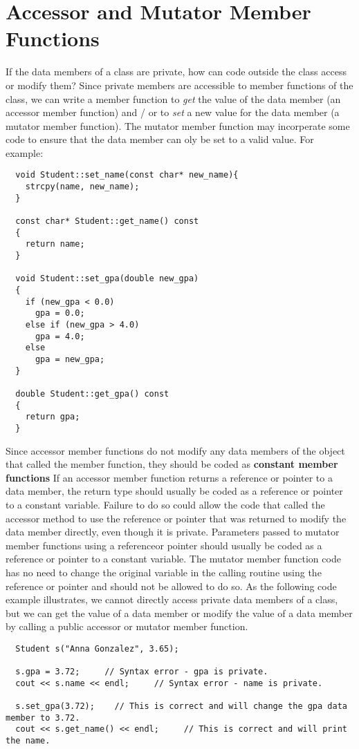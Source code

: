 \documentclass{report}
\begin{document}
  \section{Accessor and Mutator Member Functions}
  If the data members of a class are private, how can code outside the class access or modify them?
  \bigbreak \noindent
  Since private members are accessible to member functions of the class, we can write a member function to \textit{get} the value of the data member (an accessor member function) and / or to \textit{set} a new value for the data member (a mutator member function). The mutator member function may incorperate some code to ensure that the data member can oly be set to a valid value. For example:
  \begin{verbatim}
  void Student::set_name(const char* new_name){
    strcpy(name, new_name);
  }

  const char* Student::get_name() const
  {
    return name;
  }

  void Student::set_gpa(double new_gpa)
  {
    if (new_gpa < 0.0)
      gpa = 0.0;
    else if (new_gpa > 4.0)
      gpa = 4.0;
    else
      gpa = new_gpa;
  }

  double Student::get_gpa() const
  {
    return gpa;
  }
  \end{verbatim}
  \bigbreak \noindent
  Since accessor member functions do not modify any data members of the object that called the member function, they should be coded as \textbf{constant member functions}
  \bigbreak \noindent
  If an accessor member function returns a reference or pointer to a data member, the return type should usually be coded as a reference or pointer to a constant variable. Failure to do so could allow  the code that called the accessor method to use the reference or pointer that was returned to modify the data member directly, even though it is private.
  \bigbreak \noindent
  Parameters passed to mutator member functions using a referenceor pointer should usually be coded as a reference or pointer to a constant variable. The mutator member function code has no need to change the original variable in the calling routine using the reference or pointer and should not be allowed to do so.
  \bigbreak \noindent
  As the following code example illustrates, we cannot directly access private data members of a class, but we can get the value of a data member or modify the value of a data member by calling a public accessor or mutator member function.
  \begin{mdframed}
  \begin{verbatim}
  Student s("Anna Gonzalez", 3.65);

  s.gpa = 3.72;     // Syntax error - gpa is private.
  cout << s.name << endl;     // Syntax error - name is private.

  s.set_gpa(3.72);    // This is correct and will change the gpa data member to 3.72.
  cout << s.get_name() << endl;     // This is correct and will print the name.
  \end{verbatim}
  \end{mdframed}
  \newpage
\end{document}
